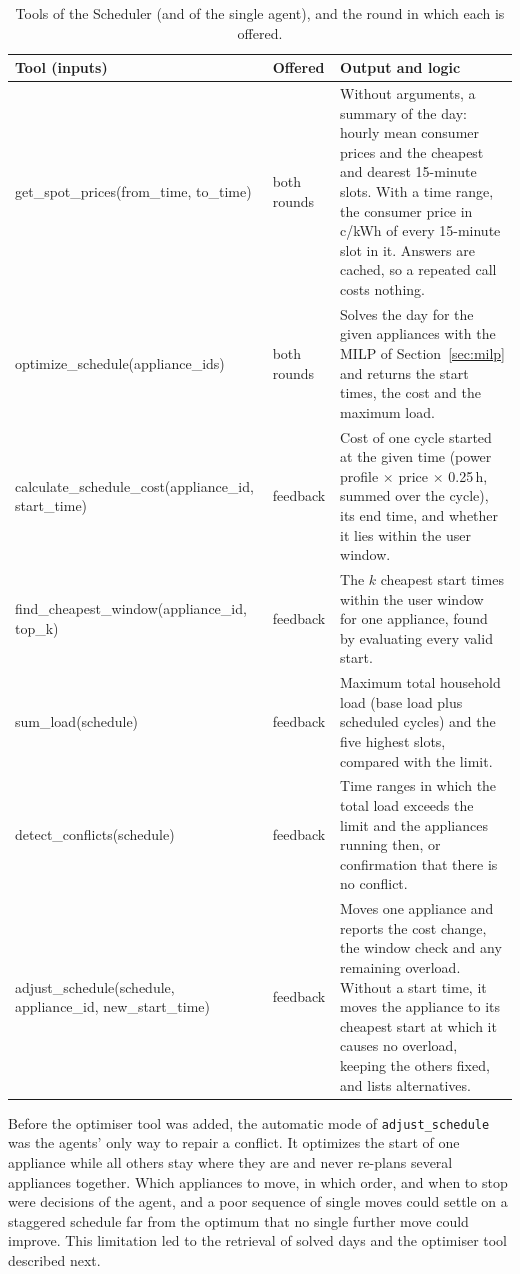 \documentclass[12pt,a4paper]{report}
\begin{document}
\begin{table}[h!]
\caption{Tools of the Scheduler (and of the single agent), and the round in which each is offered.}
\label{tab:tools}
\small
\begin{tabularx}{\textwidth}{>{\ttfamily\footnotesize\raggedright}p{4.3cm}lX}
\toprule
\normalfont Tool (inputs) & Offered & Output and logic \\
\midrule
get\_spot\_prices(\allowbreak from\_time, to\_time) & both rounds &
  Without arguments, a summary of the day: hourly mean consumer prices
  and the cheapest and dearest 15-minute slots. With a time range, the
  consumer price in c/kWh of every 15-minute slot in it. Answers are
  cached, so a repeated call costs nothing. \\[2pt]
optimize\_schedule(\allowbreak appliance\_ids) & both rounds &
  Solves the day for the given appliances with the MILP of
  Section~\ref{sec:milp} and returns the start times, the cost and the
  maximum load. \\[2pt]
calculate\_\allowbreak schedule\_cost(\allowbreak appliance\_id, start\_time) & feedback &
  Cost of one cycle started at the given time (power profile $\times$
  price $\times$ 0.25\,h, summed over the cycle), its end time, and
  whether it lies within the user window. \\[2pt]
find\_cheapest\_\allowbreak window(\allowbreak appliance\_id, top\_k) & feedback &
  The $k$ cheapest start times within the user window for one appliance,
  found by evaluating every valid start. \\[2pt]
sum\_load(schedule) & feedback &
  Maximum total household load (base load plus scheduled cycles) and the
  five highest slots, compared with the limit. \\[2pt]
detect\_conflicts(\allowbreak schedule) & feedback &
  Time ranges in which the total load exceeds the limit and the
  appliances running then, or confirmation that there is no conflict. \\[2pt]
adjust\_schedule(\allowbreak schedule, appliance\_id, new\_start\_time) & feedback &
  Moves one appliance and reports the cost change, the window check and
  any remaining overload. Without a start time, it moves the appliance to
  its cheapest start at which it causes no overload, keeping the others
  fixed, and lists alternatives. \\
\bottomrule
\end{tabularx}
\end{table}

Before the optimiser tool was added, the automatic mode of
\texttt{adjust\_schedule} was the agents' only way to repair a conflict.
It optimizes the start of one appliance while all others stay where they
are and never re-plans several appliances together. Which appliances to
move, in which order, and when to stop were decisions of the agent, and
a poor sequence of single moves could settle on a staggered schedule
far from the optimum that no single further move could improve. This
limitation led to the retrieval of solved days and the optimiser tool
described next.
\end{document}
